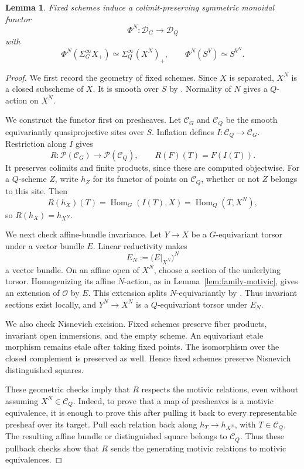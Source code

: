 \documentclass[11pt,reqno]{amsart}
\newtheorem{lemma}[theorem]{Lemma}
\theoremstyle{definition}
\theoremstyle{remark}
\theoremstyle{plain}
\numberwithin{equation}{section}
\newcommand{\D}{\mathcal D}
\begin{document}
\begin{lemma}\label{lem:fixed-scheme-functor}
Fixed schemes induce a colimit-preserving symmetric monoidal functor
\[
 \Phi^N:\D_G\longrightarrow\D_Q
\]
with
\[
 \Phi^N(\Sigma^\infty_G X_+)
   \simeq\Sigma^\infty_Q(X^N)_+,
 \qquad
 \Phi^N(S^V)\simeq S^{V^N}.
\]
\end{lemma}

\begin{proof}
We first record the geometry of fixed schemes.
Since \(X\) is separated, \(X^N\) is a closed subscheme of \(X\).
It is smooth over \(S\) by
\cite[Theorem~4.3.6]{RomagnyFixedPoints}.
Normality of \(N\) gives a \(Q\)-action on \(X^N\).

We construct the functor first on presheaves.
Let \(\mathcal C_G\) and \(\mathcal C_Q\) be the smooth
equivariantly quasiprojective sites over \(S\).
Inflation defines \(I:\mathcal C_Q\to\mathcal C_G\).
Restriction along \(I\) gives
\[
 R:\mathcal P(\mathcal C_G)\longrightarrow
   \mathcal P(\mathcal C_Q),
 \qquad R(F)(T)=F(I(T)).
\]
It preserves colimits and finite products, since these are computed
objectwise.
For a \(Q\)-scheme \(Z\), write \(h_Z\) for its functor of points
on \(\mathcal C_Q\), whether or not \(Z\) belongs to this site.
Then
\[
 R(h_X)(T)
 =\operatorname{Hom}_G(I(T),X)
 =\operatorname{Hom}_Q(T,X^N),
\]
so \(R(h_X)=h_{X^N}\).

We next check affine-bundle invariance.
Let \(Y\to X\) be a \(G\)-equivariant torsor under a vector bundle
\(E\).
Linear reductivity makes
\[
 E_N:=\bigl(E|_{X^N}\bigr)^N
\]
a vector bundle.
On an affine open of \(X^N\), choose a section of the underlying
torsor.
Homogenizing its affine \(N\)-action, as in
Lemma~\ref{lem:family-motivic}, gives an extension of
\(\mathcal O\) by \(E\).
This extension splits \(N\)-equivariantly by
\cite[Lemma~2.17]{Hoyois}.
Thus invariant sections exist locally, and
\(Y^N\to X^N\) is a \(Q\)-equivariant torsor under \(E_N\).

We also check Nisnevich excision.
Fixed schemes preserve fiber products, invariant open immersions,
and the empty scheme.
An equivariant etale morphism remains etale after taking fixed
points.
The isomorphism over the closed complement is preserved as well.
Hence fixed schemes preserve Nisnevich distinguished squares.

These geometric checks imply that \(R\) respects the motivic
relations, even without assuming \(X^N\in\mathcal C_Q\).
Indeed, to prove that a map of presheaves is a motivic equivalence, 
it is enough to prove this after pulling it back to every representable presheaf over its target.
Pull each relation back along \(h_T\to h_{X^N}\), with
\(T\in\mathcal C_Q\).
The resulting affine bundle or distinguished square belongs to
\(\mathcal C_Q\).
Thus these pullback checks show that \(R\) sends the generating
motivic relations to motivic equivalences.


\end{proof}
\end{document}
